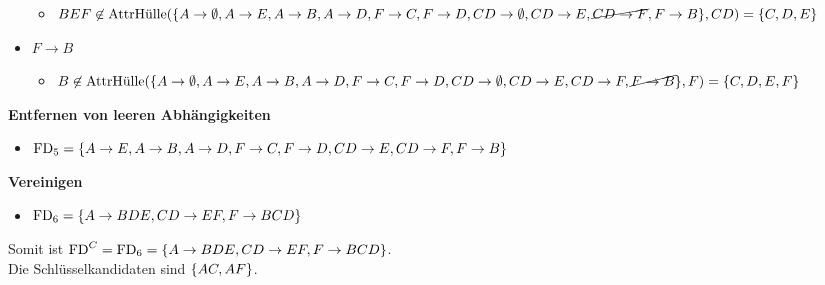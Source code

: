 \documentclass[main.tex]{subfiles}
\begin{document}
\begin{itemize}
\begin{itemize}
        \item $BEF \not\in \text{AttrHülle}(\{A\to \emptyset, A\to E, A\to B, A\to D, F\to C, F\to D, CD\to\emptyset, CD\to E, \cancel{CD\to F}, F\to B\}, CD) = \{C, D, E\}$ 
    \end{itemize}
    \item $F\to B$
    \begin{itemize}
        \item $B \not\in \text{AttrHülle}(\{A\to \emptyset, A\to E, A\to B, A\to D, F\to C, F\to D, CD\to\emptyset, CD\to E, CD\to F, \cancel{F\to B}\}, F) = \{C, D, E, F\}$
    \end{itemize}
\end{itemize}

\textbf{Entfernen von leeren Abhängigkeiten}
\begin{itemize}
    \item $\text{FD}_5= \{A\to E, A\to B, A\to D, F\to C, F\to D, CD\to E, CD\to F, F\to B\}$
\end{itemize}

\textbf{Vereinigen}
\begin{itemize}
    \item $\text{FD}_6 = \{A\to BDE, CD\to EF, F\to BCD\}$
\end{itemize}

Somit ist $\text{FD}^C = \text{FD}_6 = \{A\to BDE, CD\to EF, F\to BCD\}$.\\
Die Schlüsselkandidaten sind $\{AC, AF\}$.
\end{document}
